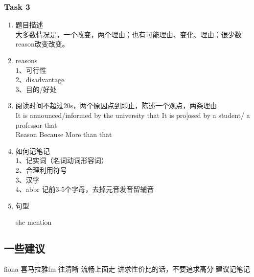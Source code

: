 \documentclass[UTF8]{ctexart}
\begin{document}
\subsubsection{Task 3}
\begin{enumerate}
  \item 题目描述\\
  大多数情况是，一个改变，两个理由；也有可能理由、变化、理由；很少数reason改变改变。\\
  \item reasons\\
  1、可行性\\
  2、disadvantage\\
  3、目的/好处\\
  \item 阅读时间不超过20s，两个原因点到即止，陈述一个观点，两条理由\\
  It is announced/informed by the university that   It is pro[osed by a student/ a professor that\\
  Reason Because More than that\\
  \item 如何记笔记\\
  1、记实词（名词动词形容词）\\
  2、合理利用符号\\
  3、汉字\\
  4、abbr 记前3-5个字母，去掉元音发音留辅音\\
  \item 句型
  
  she mention 
\end{enumerate}
\subsection{一些建议}
fiona 喜马拉雅fm 往清晰 流畅上面走 讲求性价比的话，不要追求高分 建议记笔记
\end{document}
